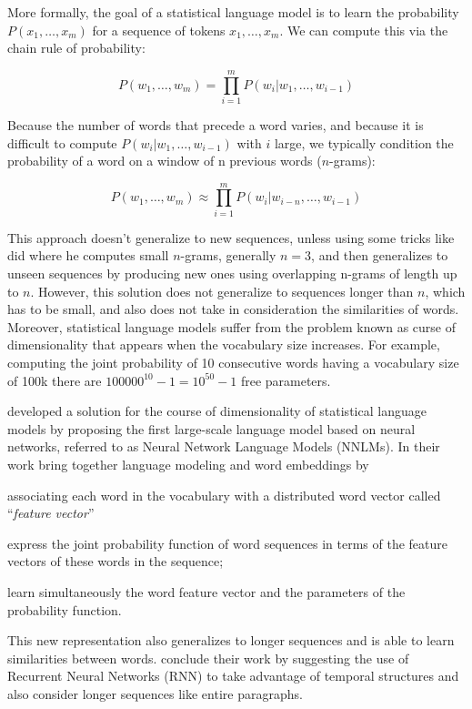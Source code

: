 More formally, the goal of a statistical language model is to learn the probability $P(x_1, \dots, x_m)$ for a sequence of tokens $x_1, \dots, x_m$. We can compute this via the chain rule of probability:

\begin{equation}
P\left(w_{1}, \ldots, w_{m}\right)=\prod_{i=1}^{m} P\left(w_{i} | w_{1}, \dots, w_{i-1}\right)
\end{equation}

Because the number of words that precede a word varies, and because it is difficult to compute $P(w_i | w_1,\dots, w_{i-1})$ with $i$ large, we typically condition the probability of a word on a window of n previous words ($n$-grams): 


\begin{equation}
P\left(w_{1}, \ldots, w_{m}\right) \approx \prod_{i=1}^{m} P\left(w_{i} | w_{i-n}, \dots, w_{i-1}\right)
\end{equation}

This approach doesn't generalize to new sequences, unless using some tricks like~\citet{katz1987probablm} did where he computes small $n$-grams, generally $n=3$, and then generalizes to unseen sequences by producing new ones using overlapping n-grams of length up to $n$. However, this solution does not generalize to sequences longer than $n$, which has to be small, and also does not take in consideration the similarities of words. Moreover, statistical language models suffer from the problem known as curse of dimensionality that appears when the vocabulary size increases. For example, computing the joint probability of 10 consecutive words having a vocabulary size of 100k there are $100000^{10} - 1 = 10^{50} - 1$ free parameters. 

\citet{bengio2000nnlm} developed a solution for the course of dimensionality of statistical language models by proposing the first large-scale language model based on neural networks, referred to as Neural Network Language Models (NNLMs). In their work \citet{bengio2000nnlm} bring together language modeling and word embeddings by \begin {enumerate*} [1) ]%
\item associating each word in the vocabulary with a distributed word vector called ``\textit{feature vector}'' \item express the joint probability function of word sequences in terms of the feature vectors of these words in the sequence; \item learn simultaneously the word feature vector and the parameters of the probability function.
\end {enumerate*} This new representation also generalizes to longer sequences and is able to learn similarities between words. \citet{bengio2000nnlm} conclude their work by suggesting the use of Recurrent Neural Networks (RNN) to take advantage of temporal structures and also consider longer sequences like entire paragraphs.

